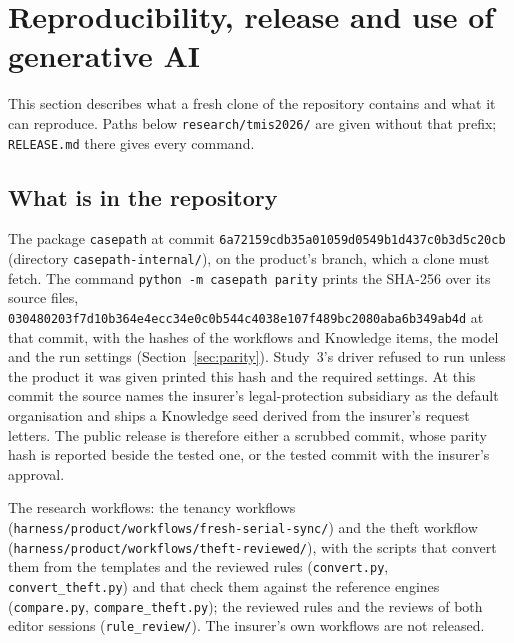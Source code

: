 \section{Reproducibility, release and use of generative AI}
\label{app:release}
\label{app:repro}

This section describes what a fresh clone of the repository \cite{casepath2026repo} contains and what it can reproduce. Paths below \texttt{research/\allowbreak{}tmis2026/} are given without that prefix; \texttt{RELEASE.md} there gives every command.

\subsection{What is in the repository}
\label{app:release-contents}

{\sloppy
\begin{description}[leftmargin=1em,style=nextline,itemsep=2pt]
\item[The tested product] The package \texttt{casepath} at commit \texttt{6a72159cdb35a01059d0\allowbreak 549b1d437c0b3d5c20cb} (directory \texttt{casepath-internal/}), on the product's branch, which a clone must fetch. The command \texttt{python -m casepath parity} prints the SHA-256 over its source files, \texttt{030480203f7d10b364e4ecc3\allowbreak 4e0c0b544c4038e107f489bc\allowbreak 2080aba6b349ab4d} at that commit, with the hashes of the workflows and Knowledge items, the model and the run settings (Section~\ref{sec:parity}). Study~3's driver refused to run unless the product it was given printed this hash and the required settings. At this commit the source names the insurer's legal-protection subsidiary as the default organisation and ships a Knowledge seed derived from the insurer's request letters. The public release is therefore either a scrubbed commit, whose parity hash is reported beside the tested one, or the tested commit with the insurer's approval.
\item[The workflows] The research workflows: the tenancy workflows (\texttt{harness/\allowbreak{}product/\allowbreak{}workflows/\allowbreak{}fresh-\allowbreak{}serial-\allowbreak{}sync/}) and the theft workflow (\texttt{harness/\allowbreak{}product/\allowbreak{}workflows/\allowbreak{}theft-reviewed/}), with the scripts that convert them from the templates and the reviewed rules (\texttt{convert.py}, \texttt{convert\_theft.py}) and that check them against the reference engines (\texttt{compare.py}, \texttt{compare\_theft.py}); the reviewed rules and the reviews of both editor sessions (\texttt{rule\_review/}). The insurer's own workflows are not released.

\end{description}}
